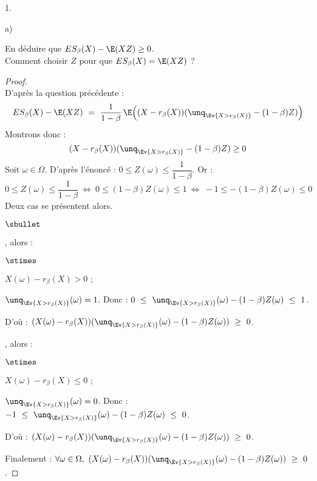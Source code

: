 \documentclass[11pt]{article}%
\begin{document}
\begin{noliste}{1.}
\begin{noliste}{a)}
    
    \item En déduire que $ES_\beta(X)-\E(XZ) \geq 0$.\\
    Comment choisir $Z$ pour que $ES_\beta(X)=\E(XZ)$ ?
    
    \begin{proof}~\\
      D'après la question précédente :
      \[
        ES_\beta(X) - \E(XZ) \ = \ \dfrac{1}{1-\beta} \, 
	\E\Big( (X- r_\beta(X)) (\unq_{\Ev{X > r_\beta(X)}} - 
	(1-\beta) Z )\Big)
      \]
      Montrons donc :
      \[
        (X- r_\beta(X)) (\unq_{\Ev{X > r_\beta(X)}} - 
	(1-\beta) Z ) \geq 0
      \]
      Soit $\omega \in \Omega$. D'après l'énoncé : $0 \leq Z(\omega) 
      \leq \dfrac{1}{1-\beta}$. Or :
      \[
        0 \leq Z(\omega) \leq \dfrac{1}{1-\beta} \ \Leftrightarrow \
        0 \leq (1-\beta)Z(\omega) \leq 1 \ \Leftrightarrow \ 
        -1 \leq -(1-\beta)Z(\omega) \leq 0
      \]
      Deux cas se présentent alors.
      \begin{noliste}{$\sbullet$}
	\item {}, alors :
	\begin{noliste}{$\stimes$}
	  \item $X(\omega) - r_\beta(X) > 0$ ;
	  \item $\unq_{\Ev{X >r_\beta(X)}}(\omega) =1$. Donc :
	  $0 \ \leq \ \unq_{\Ev{X > r_\beta(X)}}(\omega) - (1-\beta)Z 
	  (\omega) \ \leq \ 1$.
	\end{noliste}
	D'où : $(X(\omega) - r_\beta(X))(\unq_{\Ev{ X > r_\beta(X)}}
	(\omega) - (1-\beta) Z(\omega)) \ \geq \ 0$.
	
	\item {}, alors :
	\begin{noliste}{$\stimes$}
	  \item $X(\omega) - r_\beta(X) \leq 0$ ;
	  \item $\unq_{\Ev{X >r_\beta(X)}}(\omega) =0$. Donc :
	  $-1 \ \leq \ \unq_{\Ev{X > r_\beta(X)}}(\omega) - (1-\beta)Z 
	  (\omega) \ \leq \ 0$.
	\end{noliste}
	D'où : $(X(\omega) - r_\beta(X))(\unq_{\Ev{ X > r_\beta(X)}}
	(\omega) - (1-\beta) Z(\omega)) \ \geq \ 0$.
      \end{noliste}
      Finalement : $\forall \omega \in \Omega, \ 
      (X(\omega) - r_\beta(X))(\unq_{\Ev{ X > r_\beta(X)}}
      (\omega) - (1-\beta) Z(\omega)) \ \geq \ 0$.
      \conc{$(X - r_\beta(X))(\unq_{\Ev{ X > r_\beta(X)}}
      - (1-\beta) Z) \ \geq \ 0$}
      

\end{proof}
\end{noliste}
\end{noliste}
\end{document}
